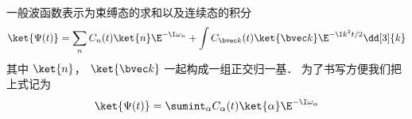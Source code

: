 

一般波函数表示为束缚态的求和以及连续态的积分
\begin{equation}
\ket{\Psi(t)} = \sum_n C_n(t)\ket{n}\E^{-\I\omega_n} + \int C_{\bvec k}(t)\ket{\bvec k}\E^{-\I k^2 t/2} \dd[3]{k}
\end{equation}
其中 $\ket{n}$， $\ket{\bvec k}$ 一起构成一组正交归一基． 为了书写方便我们把上式记为
\begin{equation}
\ket{\Psi(t)} = \sumint_\alpha C_\alpha(t) \ket{\alpha}\E^{-\I\omega_\alpha}
\end{equation}



